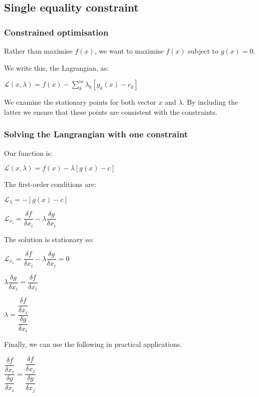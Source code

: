 
\subsection{Single equality constraint}

\subsubsection{Constrained optimisation}

Rather than maximise \(f(x)\), we want to maximise \(f(x)\) subject to \(g(x)=0\).

We write this, the Lagrangian, as:

\(\mathcal{L}(x,\lambda )=f(x)-\sum^m_k\lambda_k [g_k(x)-c_k]\)

We examine the stationary points for both vector \(x\) and \(\lambda \). By including the latter we ensure that these points are consistent with the constraints.

\subsubsection{Solving the Langrangian with one constraint}

Our function is:

\(\mathcal{L}(x, \lambda )=f(x)-\lambda [g(x)-c]\)

The first-order conditions are:

\(\mathcal{L}_{\lambda }= -[g(x)-c]\)

\(\mathcal{L}_{x_i}=\dfrac{\delta f}{\delta x_i}-\lambda \dfrac{\delta g}{\delta x_i}\)

The solution is stationary so:

\(\mathcal{L}_{x_i}=\dfrac{\delta f}{\delta x_i}-\lambda \dfrac{\delta g}{\delta x_i}=0\)

\(\lambda \dfrac{\delta g}{\delta x_i}=\dfrac{\delta f}{\delta x_i}\)

\(\lambda =\dfrac{\dfrac{\delta f}{\delta x_i}}{\dfrac{\delta g}{\delta x_i}}\)

Finally, we can use the following in practical applications.

\(\dfrac{\dfrac{\delta f}{\delta x_i}}{\dfrac{\delta g}{\delta x_i}}=\dfrac{\dfrac{\delta f}{\delta x_j}}{\dfrac{\delta g}{\delta x_j}}\)

